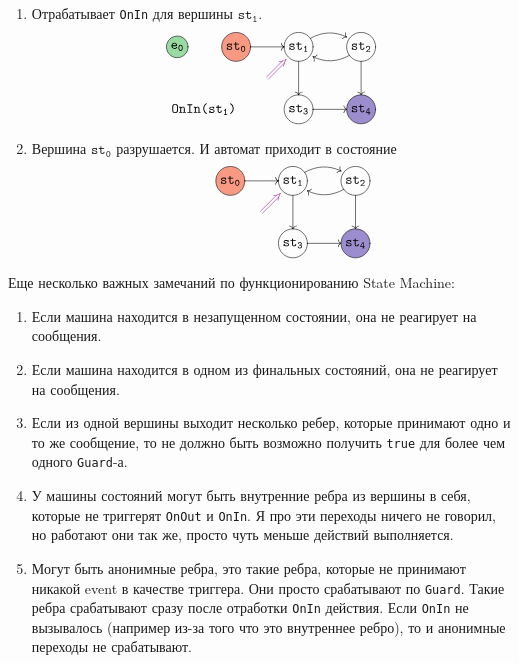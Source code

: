 \documentclass{article}
\begin{document}
{\begin{enumerate}
\item Отрабатывает \verb"OnIn" для вершины  $\texttt{st}_\texttt{1}$.
\[
\xymatrix{
  *+=+[o][F-][F*:EventColor]{\texttt{e}_\texttt{0}}&
  *+=+[o][F-][F*:InitialStateColor]{\texttt{st}_\texttt{0}}\ar[r]&
  *+=+[o][F-]{\texttt{st}_\texttt{1}}\ar@/^10pt/[r]\ar[d]&
  *+=+[o][F-]{\texttt{st}_\texttt{2}}\ar@/^10pt/[l]\ar[d]\\
  {}&
  {\mathmakebox[0pt][r]{\texttt{OnIn(st}_\texttt{1}\texttt{)}}}
  \ar@{}[ru]|(.50){}="A"|(0.8){}="B"\ar@[Plum]@{=>} "A";"B" &
  *+=+[o][F-]{\texttt{st}_\texttt{3}}\ar[r]&
  *+=+[o][F-][F*:FinalStateColor]{\texttt{st}_\texttt{4}}\\
}
\]

\item Вершина $\texttt{st}_\texttt{0}$ разрушается.
И автомат приходит в состояние
\[
\xymatrix{
  {}&
  *+=+[o][F-][F*:InitialStateColor]{\texttt{st}_\texttt{0}}\ar[r]&
  *+=+[o][F-]{\texttt{st}_\texttt{1}}\ar@/^10pt/[r]\ar[d]&
  *+=+[o][F-]{\texttt{st}_\texttt{2}}\ar@/^10pt/[l]\ar[d]\\
  {} 
  &
  {}\ar@{}[ru]|(.50){}="A"|(0.8){}="B"\ar@[Plum]@{=>} "A";"B"&
  *+=+[o][F-]{\texttt{st}_\texttt{3}}\ar[r]&
  *+=+[o][F-][F*:FinalStateColor]{\texttt{st}_\texttt{4}}\\
}
\]
\end{enumerate}
Еще несколько важных замечаний по функционированию State Machine:
\begin{enumerate}
\item Если машина находится в незапущенном состоянии, она не реагирует на сообщения.

\item Если машина находится в одном из финальных состояний, она не реагирует на сообщения.

\item Если из одной вершины выходит несколько ребер, которые принимают одно и то же сообщение, то не должно быть возможно получить \verb"true" для более чем одного \verb"Guard"-а.

\item У машины состояний могут быть внутренние ребра из вершины в себя, которые не триггерят \verb"OnOut" и \verb"OnIn".
Я про эти переходы ничего не говорил, но работают они так же, просто чуть меньше действий выполняется.

\item Могут быть анонимные ребра, это такие ребра, которые не принимают никакой event в качестве триггера.
Они просто срабатывают по \verb"Guard".
Такие ребра срабатывают сразу после отработки \verb"OnIn" действия.
Если \verb"OnIn" не вызывалось (например из-за того что это внутреннее ребро), то и анонимные переходы не срабатывают.


\end{enumerate}}
\end{document}
